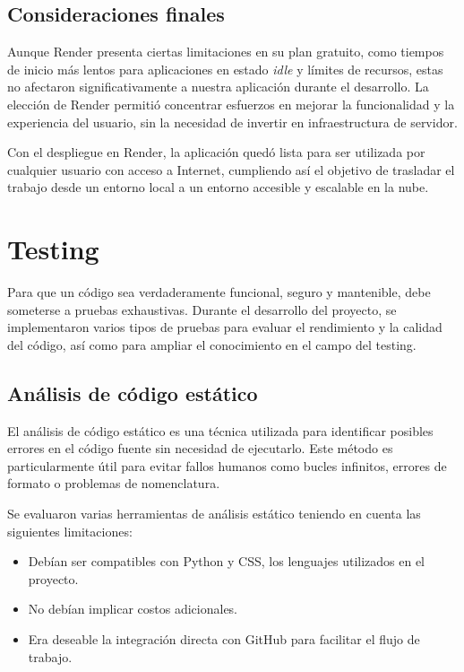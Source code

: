 \subsection{Consideraciones finales}

Aunque Render presenta ciertas limitaciones en su plan gratuito, como tiempos de inicio más lentos para aplicaciones en estado \textit{idle} y límites de recursos, estas no afectaron significativamente a nuestra aplicación durante el desarrollo. La elección de Render permitió concentrar esfuerzos en mejorar la funcionalidad y la experiencia del usuario, sin la necesidad de invertir en infraestructura de servidor.

Con el despliegue en Render, la aplicación quedó lista para ser utilizada por cualquier usuario con acceso a Internet, cumpliendo así el objetivo de trasladar el trabajo desde un entorno local a un entorno accesible y escalable en la nube.

\section{Testing}

Para que un código sea verdaderamente funcional, seguro y mantenible, debe someterse a pruebas exhaustivas. Durante el desarrollo del proyecto, se implementaron varios tipos de pruebas para evaluar el rendimiento y la calidad del código, así como para ampliar el conocimiento en el campo del testing.

\subsection{Análisis de código estático}

El análisis de código estático es una técnica utilizada para identificar posibles errores en el código fuente sin necesidad de ejecutarlo. Este método es particularmente útil para evitar fallos humanos como bucles infinitos, errores de formato o problemas de nomenclatura.

Se evaluaron varias herramientas de análisis estático teniendo en cuenta las siguientes limitaciones:
\begin{itemize}
    \item Debían ser compatibles con Python y CSS, los lenguajes utilizados en el proyecto.
    \item No debían implicar costos adicionales.
    \item Era deseable la integración directa con GitHub para facilitar el flujo de trabajo.
\end{itemize}

